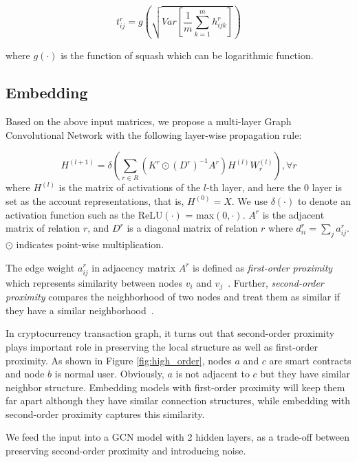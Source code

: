 \begin{equation}
t_{ij}^r=g(\sqrt{Var[\frac{1}{m}\sum_{k=1}^m h_{ijk}^r]})
\label{eq:time}
\end{equation}

\noindent where $g(\cdot)$ is the function of squash which can be logarithmic function.

\subsection{Embedding}
\label{sec:rGCN layers}
Based on the above input matrices, we propose a multi-layer Graph Convolutional Network with the following layer-wise propagation rule:

\begin{equation}
H^{(l+1)}=\delta(\sum_{r\in R} (K^r\odot (D^r)^{-1}A^r)H^{(l)}W_r^{(l)}),\forall r
\end{equation}
\noindent where $H^{(l)}$ is the matrix of activations of the $l$-th layer, and here the $0$ layer is set as the account representations, that is, $H^{(0)}=X$. We use $\delta(\cdot)$ to denote an activation function such as the ReLU$(\cdot)$ = max$(0,\cdot)$. $A^r$ is the adjacent matrix of relation $r$, and $D^r$ is a diagonal matrix of relation $r$ where $d^r_{ii}=\sum_{j}a^r_{ij}$. $\odot$ indicates point-wise multiplication.

The edge weight $a^r_{ij}$ in adjacency matrix $A^r$ is defined as \emph{first-order proximity} which represents similarity between nodes $v_i$ and $v_j$~\cite{tang2015line}. Further, \emph{second-order proximity} compares the neighborhood of two nodes and treat them as similar if they have a similar neighborhood~\cite{goyal2018graph}.

In cryptocurrency transaction graph, it turns out that second-order proximity plays important role in preserving the local structure as well as first-order proximity. As shown in Figure \ref{fig:high_order}, nodes $a$ and $c$ are smart contracts and node $b$ is normal user. Obviously, $a$ is not adjacent to $c$  but they have similar neighbor structure. Embedding models with first-order proximity will keep them far apart although they have similar connection structures, while embedding with second-order proximity captures this similarity.

 We feed the input into a GCN model with 2 hidden layers, as a trade-off between preserving second-order proximity and introducing noise. 
 

